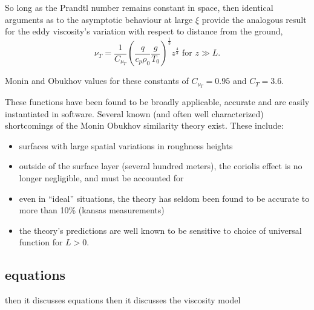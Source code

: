 So long as the Prandtl number remains constant in space\cite{}, then
identical arguments as to the asymptotic behaviour at large $\xi$ provide
the analogous result for the eddy viscosity's variation with respect to
distance from the ground,  
\begin{equation}
 \nu_T = \frac{1}{C_{\nu_T}} \left( \frac{q}{c_p \rho_0} \frac{g}{T_0}
			     \right)^\frac{1}{3} z^{\frac{4}{3}}  \text{ 
for } z \gg L. 
\end{equation}

Monin and Obukhov values for these constants of $C_{\nu_T} = 0.95$ and
$C_{T} = 3.6$.  

These functions have been found to be broadly applicable, accurate and 
are easily instantiated in software. Several known (and often well
characterized) shortcomings of the Monin Obukhov similarity theory
exist. These include: 

\begin{itemize}
 \item surfaces with large spatial variations in roughness heights
 \item outside of the surface layer (several hundred meters), the
       coriolis effect is no longer negligible, and must be accounted for
 \item even in ``ideal'' situations, the theory has seldom been found to
      be accurate to more than 10\% (kansas measurements)\cite{}
\item the theory's predictions are well known to be sensitive to choice
      of universal function for $L>0$.
\end{itemize}


\subsection{equations}

then it discusses equations
then it discusses the viscosity model
